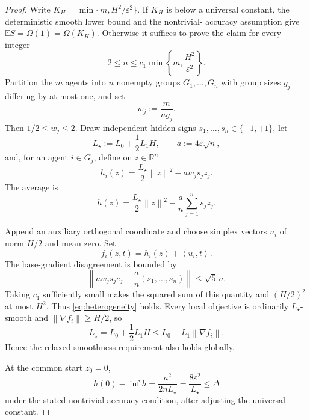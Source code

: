 \documentclass[11pt,a4paper]{article}
\newcommand{\R}{\mathbb{R}}
\newcommand{\E}{\mathbb{E}}
\newcommand{\eps}{\varepsilon}
\newcommand{\norm}[1]{\left\lVert #1\right\rVert}
\newcommand{\inner}[2]{\left\langle #1,#2\right\rangle}
\theoremstyle{remark}
\begin{document}
\begin{proof}
Write $K_H=\min\{m,H^2/\eps^2\}$.  If $K_H$ is below a
universal constant, the deterministic smooth lower bound and the nontrivial-
accuracy assumption give $\E S=\Omega(1)=\Omega(K_H)$.  Otherwise it
suffices to prove the claim for every integer
\begin{equation}
 2\le n\le c_1\min\left\{m,\frac{H^2}{\eps^2}\right\}.
 \label{eq:n-discovery-choice}
\end{equation}
Partition the $m$ agents into $n$ nonempty groups $G_1,\ldots,G_n$ with group
sizes $g_j$ differing by at most one, and set
\[
 w_j:=\frac{m}{ng_j}.
\]
Then $1/2\le w_j\le2$.  Draw independent hidden signs
$s_1,\ldots,s_n\in\{-1,+1\}$, let
\[
 L_\star:=L_0+\frac12L_1H,
 \qquad
 a:=4\eps\sqrt n,
\]
and, for an agent $i\in G_j$, define on $z\in\R^n$
\begin{equation}
 h_i(z)=\frac{L_\star}{2}\norm z^2-a w_j s_jz_j.
 \label{eq:sign-local}
\end{equation}
The average is
\begin{equation}
 h(z)=\frac{L_\star}{2}\norm z^2
 -\frac an\sum_{j=1}^ns_jz_j.
 \label{eq:sign-average}
\end{equation}

Append an auxiliary orthogonal coordinate and choose simplex vectors $u_i$
of norm $H/2$ and mean zero.  Set
\begin{equation}
 f_i(z,t)=h_i(z)+\inner{u_i}{t}.
 \label{eq:sign-embedded}
\end{equation}
The base-gradient disagreement is bounded by
\begin{equation}
 \norm{a w_js_je_j-\frac an(s_1,\ldots,s_n)}
 \le\sqrt5\,a.
 \label{eq:sign-base-heterogeneity}
\end{equation}
Taking $c_1$ sufficiently small makes the squared sum of this quantity and
$(H/2)^2$ at most $H^2$.  Thus \eqref{eq:heterogeneity} holds.  Every local
objective is ordinarily $L_\star$-smooth and
$\norm{\nabla f_i}\ge H/2$, so
\[
 L_\star=L_0+\frac12L_1H
 \le L_0+L_1\norm{\nabla f_i}.
\]
Hence the relaxed-smoothness requirement also holds globally.

At the common start $z_0=0$,
\begin{equation}
 h(0)-\inf h
 =\frac{a^2}{2nL_\star}
 =\frac{8\eps^2}{L_\star}
 \le\Delta
 \label{eq:sign-gap}
\end{equation}
under the stated nontrivial-accuracy condition, after adjusting the universal
constant.


\end{proof}
\end{document}
